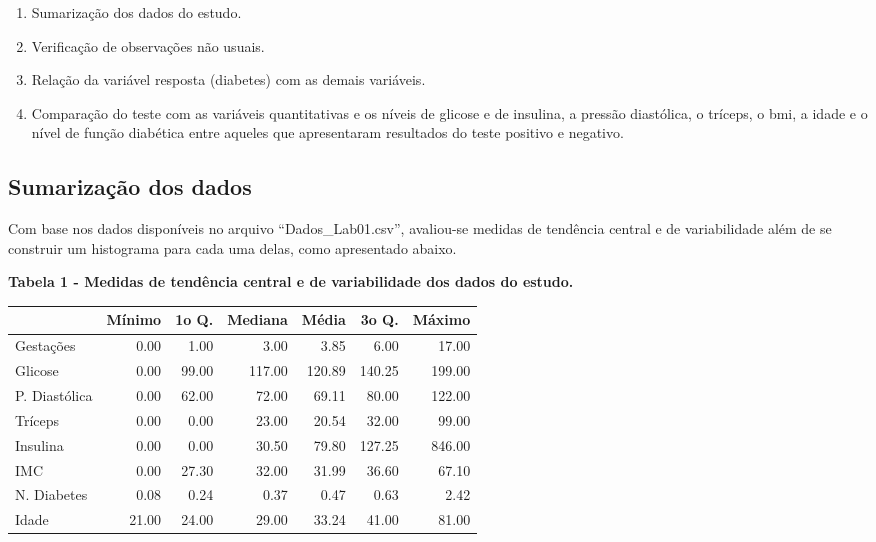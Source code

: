 \documentclass[
]{article}
\providecommand{\tightlist}{%
  \setlength{\itemsep}{0pt}\setlength{\parskip}{0pt}}
\begin{document}
\begin{enumerate}
\def\labelenumi{\arabic{enumi}.}
\tightlist
\item
  Sumarização dos dados do estudo.
\item
  Verificação de observações não usuais.
\item
  Relação da variável resposta (diabetes) com as demais variáveis.
\item
  Comparação do teste com as variáveis quantitativas e os níveis de
  glicose e de insulina, a pressão diastólica, o tríceps, o bmi, a idade
  e o nível de função diabética entre aqueles que apresentaram
  resultados do teste positivo e negativo.
\end{enumerate}

\newline
\newline

\hypertarget{sumarizauxe7uxe3o-dos-dados}{%
\subsection{Sumarização dos dados}\label{sumarizauxe7uxe3o-dos-dados}}

\newline
\newline

Com base nos dados disponíveis no arquivo ``Dados\_Lab01.csv'',
avaliou-se medidas de tendência central e de variabilidade além de se
construir um histograma para cada uma delas, como apresentado abaixo.

\newline

\textbf{Tabela 1 - Medidas de tendência central e de variabilidade dos
dados do estudo.}

\begin{longtable}[]{@{}lrrrrrr@{}}
\toprule()
& Mínimo & 1o Q. & Mediana & Média & 3o Q. & Máximo \\
\midrule()
\endhead
Gestações & 0.00 & 1.00 & 3.00 & 3.85 & 6.00 & 17.00 \\
Glicose & 0.00 & 99.00 & 117.00 & 120.89 & 140.25 & 199.00 \\
P. Diastólica & 0.00 & 62.00 & 72.00 & 69.11 & 80.00 & 122.00 \\
Tríceps & 0.00 & 0.00 & 23.00 & 20.54 & 32.00 & 99.00 \\
Insulina & 0.00 & 0.00 & 30.50 & 79.80 & 127.25 & 846.00 \\
IMC & 0.00 & 27.30 & 32.00 & 31.99 & 36.60 & 67.10 \\
N. Diabetes & 0.08 & 0.24 & 0.37 & 0.47 & 0.63 & 2.42 \\
Idade & 21.00 & 24.00 & 29.00 & 33.24 & 41.00 & 81.00 \\
\bottomrule()
\end{longtable}
\end{document}
